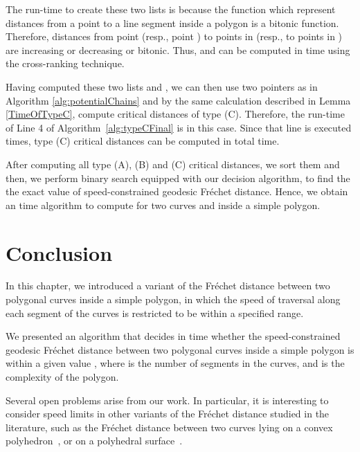 \documentclass[12pt]{dalthesis}
\def\favoritefont{\bfseries \sffamily}
\def\QED{\ensuremath{{\Box}}}
\def\markatright#1{\leavevmode\unskip\nobreak\quad\hspace*{\fill}{#1}}
\newenvironment{proof}
	{\begin{trivlist}\item[\hskip\labelsep{\favoritefont Proof:}]}
	{\markatright{\QED}\end{trivlist}}
\newcommand{\Frechet}{Fr\'echet }
\begin{document}
\begin{proof}
The run-time to create these two lists is  because
the function which represent distances from a 
point to a line segment inside a polygon is a bitonic function. 
Therefore, distances from point  (resp., point )  to points in  (resp., to points in  )
are increasing or decreasing or bitonic. 
Thus,  and  can be computed 
 in  time using the cross-ranking technique. 





Having computed these two lists  and , 
we can then use two pointers as in Algorithm 
\ref{alg:potentialChains} and 
by the same  calculation 
described in Lemma \ref{TimeOfTypeC}, 
compute critical distances of type (C).
Therefore, the run-time of Line 4 of Algorithm~\ref{alg:typeCFinal} 
is  in this case. Since that line is executed 
 times, type (C) 
critical distances can be computed in  total time.









After computing all type (A), (B) and (C) critical distances, we sort them 
and then, we perform binary search equipped with our decision algorithm, 
to find the the exact value of 
speed-constrained geodesic \Frechet  distance. 
Hence, we obtain an  time algorithm to compute 
for two curves  and  inside a simple polygon.
\end{proof}





\section{Conclusion}
In this chapter, we introduced a variant of the \Frechet distance between two polygonal curves inside a 
simple polygon,
in which the speed of traversal along each segment of the curves is restricted to be within a specified range.


We presented an algorithm that decides in  
time whether the speed-constrained geodesic \Frechet distance between two polygonal curves inside a 
simple polygon is within a given value , 
where  is the number of segments in the curves, and  is the complexity of the polygon. 


Several open problems arise from our work.
In particular, it is interesting to consider speed limits in
other variants of the \Frechet distance studied in the literature,
such as the \Frechet distance between two curves lying 
on a convex polyhedron~\cite{AnilFrechet}, or on a polyhedral surface~\cite{Cook2009}. 
\end{document}
